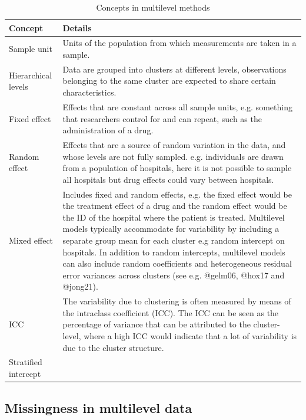 \documentclass[
]{jss}
\begin{document}
\begin{CodeChunk}
\begin{table}

\caption{\label{tab:clus}Concepts in multilevel methods}
\centering
\begin{tabular}[t]{>{\raggedright\arraybackslash}p{3cm}>{\raggedright\arraybackslash}p{12cm}}
\toprule
Concept & Details\\
\midrule
Sample unit & Units of the population from which measurements are taken in a sample.\\
Hierarchical levels & Data are grouped into clusters at different levels, observations belonging to the same cluster are expected to share certain characteristics.\\
Fixed effect & Effects that are constant across all sample units, e.g. something that researchers control for and can repeat, such as the administration of a drug.\\
Random effect & Effects that are a source of random variation in the data, and whose levels are not fully sampled. e.g. individuals are drawn from a population of hospitals, here it is not possible to sample all hospitals but drug effects could vary between hospitals.\\
Mixed effect & Includes fixed and random effects, e.g. the fixed effect would be the treatment effect of a drug and the random effect would be the ID of the hospital where the patient is treated. Multilevel models typically accommodate for variability by including a separate group mean for each cluster e.g random intercept on hospitals. In addition to random intercepts, multilevel models can also include random coefficients and heterogeneous residual error variances across clusters (see e.g. @gelm06, @hox17 and @jong21).\\
\addlinespace
ICC & The variability due to clustering is often measured by means of the intraclass coefficient (ICC). The ICC can be seen as the percentage
of variance that can be attributed to the cluster-level, where a high ICC would indicate that a lot of variability is due to the cluster structure.\\
Stratified intercept & \\
\bottomrule
\end{tabular}
\end{table}

\end{CodeChunk}

\hypertarget{missingness-in-multilevel-data}{%
\subsection{Missingness in multilevel
data}\label{missingness-in-multilevel-data}}
\end{document}
